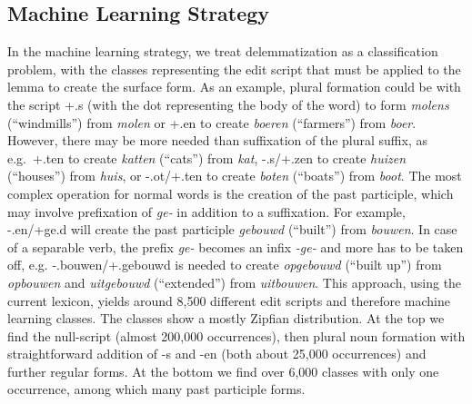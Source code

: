 \documentclass[a4paper,10pt,twoside]{article}
\begin{document}
 
\subsection{Machine Learning Strategy}
\label{sec_ml}
In the machine learning strategy, we treat delemmatization as a classification problem, with the classes representing the edit script that must be applied to the lemma to create the surface form. As an example, plural formation could be with the script +.s (with the dot representing the body of the word) to form \textit{molens} (``windmills'') from \textit{molen} or +.en to create \textit{boeren} (``farmers'') from \textit{boer}. However, there may be more needed than suffixation of the plural suffix, as e.g.\ +.ten to create \textit{katten} (``cats'') from \textit{kat}, -.s/+.zen to create \textit{huizen} (``houses'') from \textit{huis}, or -.ot/+.ten to create \textit{boten} (``boats'') from \textit{boot}. The most complex operation for normal words is the creation of the past participle, which may involve prefixation of \textit{ge-} in addition to a suffixation. For example, -.en/+ge.d will create the past participle \textit{gebouwd} (``built'') from \textit{bouwen}. In case of a separable verb, the prefix \textit{ge-} becomes an infix \textit{-ge-} and more has to be taken off, e.g. -.bouwen/+.gebouwd is needed to create \textit{opgebouwd} (``built up'') from \textit{opbouwen} and \textit{uitgebouwd} (``extended'') from \textit{uitbouwen}. This approach, using the current lexicon, yields around 8,500 different edit scripts and therefore machine learning classes. The classes show a mostly Zipfian distribution. At the top we find the null-script (almost 200,000 occurrences), then plural noun formation with straightforward addition of -s and -en (both about 25,000 occurrences) and further regular forms. At the bottom we find over 6,000 classes with only one occurrence, among which many past participle forms.
\end{document}
